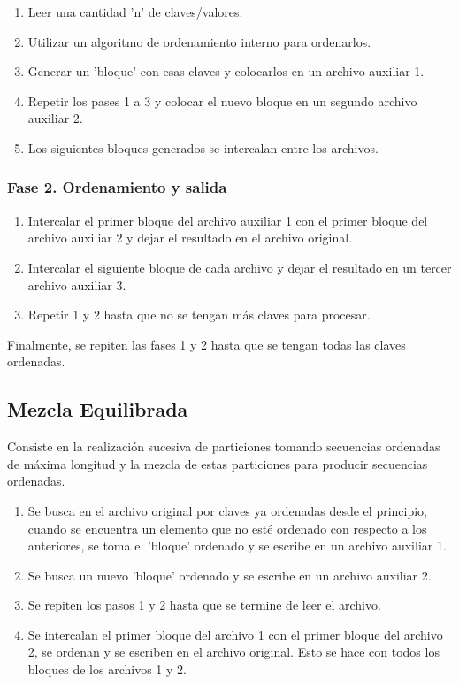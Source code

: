 \documentclass[letter]{report}
\begin{document}
\begin{enumerate}
    \item Leer una cantidad 'n' de claves/valores.
    \item Utilizar un algoritmo de ordenamiento interno para ordenarlos.
    \item Generar un 'bloque' con esas claves y colocarlos en un archivo auxiliar 1.
    \item Repetir los pases 1 a 3 y colocar el nuevo bloque en un segundo archivo auxiliar 2.
    \item Los siguientes bloques generados se intercalan entre los archivos.
\end{enumerate}

\subsubsection*{Fase 2. Ordenamiento y salida}

\begin{enumerate}
    \item Intercalar el primer bloque del archivo auxiliar 1 con el primer bloque del archivo auxiliar 2 y dejar el resultado en el archivo original.
    \item Intercalar el siguiente bloque de cada archivo y dejar el resultado en un tercer archivo auxiliar 3.
    \item Repetir 1 y 2 hasta que no se tengan más claves para procesar.
\end{enumerate}

Finalmente, se repiten las fases 1 y 2 hasta que se tengan todas las claves ordenadas.

\subsection*{Mezcla Equilibrada}
Consiste en la realización sucesiva de particiones tomando secuencias ordenadas de máxima longitud y la mezcla de estas particiones para producir secuencias ordenadas.

\begin{enumerate}
    \item Se busca en el archivo original por claves ya ordenadas desde el principio, cuando se encuentra un elemento que no esté ordenado con respecto a los anteriores, se toma el 'bloque' ordenado y se escribe en un archivo auxiliar 1.
    \item Se busca un nuevo 'bloque' ordenado y se escribe en un archivo auxiliar 2.
    \item Se repiten los pasos 1 y 2 hasta que se termine de leer el archivo.
    \item Se intercalan el primer bloque del archivo 1 con el primer bloque del archivo 2, se ordenan y se escriben en el archivo original. Esto se hace con todos los bloques de los archivos 1 y 2.
\end{enumerate}
\end{document}
